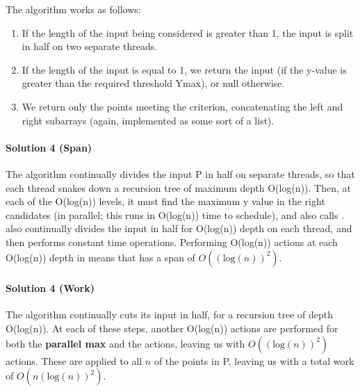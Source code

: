 \documentclass[11pt]{article}
\begin{document}
The  algorithm works as follows:

\begin{enumerate}
    \item If the length of the input being considered is greater than 1, the input is split in half on two separate threads.
    \item If the length of the input is equal to 1, we return the input (if the y-value is greater than the required threshold Ymax), or null otherwise.
    \item We return only the points meeting the criterion, concatenating the left and right subarrays (again, implemented as some sort of a list).
\end{enumerate}

\paragraph{Solution 4 (Span)}

The  algorithm continually divides the input P in half on separate threads, so that each thread snakes down a recursion tree of maximum depth O(log(n)). Then, at each of the O(log(n)) levels, it must find the maximum y value in the right candidates (in parallel; this runs in O(log(n)) time to schedule), and also calls .  also continually divides the input in half for O(log(n)) depth on each thread, and then performs constant time operations. Performing O(log(n)) actions at each O(log(n)) depth in  means that  has a span of $O((\text{log}(n))^2)$.

\paragraph{Solution 4 (Work)}

The  algorithm continually cuts its input in half, for a recursion tree of depth O(log(n)). At each of these steps, another O(log(n)) actions are performed for both the \textbf{parallel max} and the  actions, leaving us with $O((\text{log}(n))^2)$ actions. These are applied to all $n$ of the points in P, leaving us with a total work of $O(n(\text{log}(n))^2)$.
\end{document}
